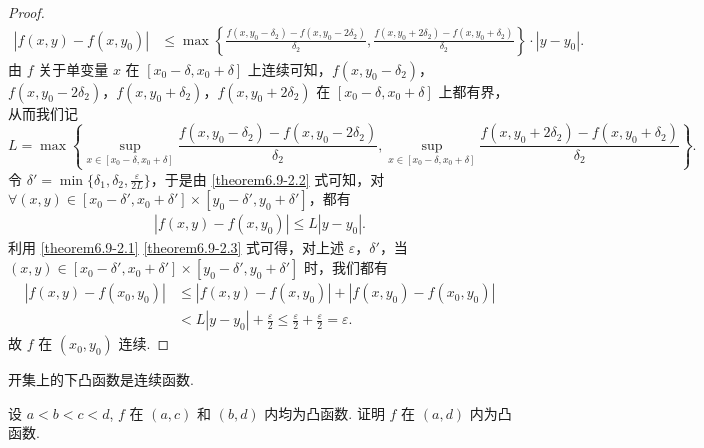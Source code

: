 \documentclass[../../main.tex]{subfiles}%
\begin{document}
\begin{proof}
\begin{align}
|f(x,y) - f(x,y_0)| &\leqslant \max\left\{\frac{f(x,y_0 - \delta_2) - f(x,y_0 - 2\delta_2)}{\delta_2},\frac{f(x,y_0 + 2\delta_2) - f(x,y_0 + \delta_2)}{\delta_2}\right\}\cdot|y - y_0|. \label{theorem6.9-2.2}
\end{align}
由 \(f\) 关于单变量 \(x\) 在 \([x_0 - \delta, x_0 + \delta]\) 上连续可知，\(f(x,y_0 - \delta_2)\)，\(f(x,y_0 - 2\delta_2)\)，\(f(x,y_0 + \delta_2)\)，\(f(x,y_0 + 2\delta_2)\) 在 \([x_0 - \delta, x_0 + \delta]\) 上都有界，从而我们记 \[L = \max\left\{\sup_{x\in [x_0 - \delta, x_0 + \delta]}\frac{f(x,y_0 - \delta_2) - f(x,y_0 - 2\delta_2)}{\delta_2},\sup_{x\in [x_0 - \delta, x_0 + \delta]}\frac{f(x,y_0 + 2\delta_2) - f(x,y_0 + \delta_2)}{\delta_2}\right\}.\]令 \(\delta' = \min\{\delta_1,\delta_2,\frac{\varepsilon}{2L}\}\)，于是由 \eqref{theorem6.9-2.2} 式可知，对 \(\forall (x,y)\in [x_0 - \delta', x_0 + \delta']\times[y_0 - \delta', y_0 + \delta']\)，都有
\begin{align}
|f(x,y) - f(x,y_0)| \leqslant L|y - y_0|. \label{theorem6.9-2.3}
\end{align}
利用 \eqref{theorem6.9-2.1} \eqref{theorem6.9-2.3} 式可得，对上述 \(\varepsilon\)，\(\delta'\)，当 \((x,y)\in [x_0 - \delta', x_0 + \delta']\times[y_0 - \delta', y_0 + \delta']\) 时，我们都有
\begin{align*}
|f(x,y) - f(x_0,y_0)| &\leqslant |f(x,y) - f(x,y_0)|+|f(x,y_0) - f(x_0,y_0)| \\
&< L|y - y_0|+\frac{\varepsilon}{2} 
\leqslant \frac{\varepsilon}{2}+\frac{\varepsilon}{2}=\varepsilon.
\end{align*}
故 \(f\) 在 \((x_0,y_0)\) 连续.
\end{proof}

\begin{corollary}[开集上的下凸函数必连续]\label{corollary:开集上的下凸函数必连续}
开集上的下凸函数是连续函数.
\end{corollary}

\begin{example}
设 $a < b < c < d$, $f$ 在 $(a,c)$ 和 $(b,d)$ 内均为凸函数. 证明 $f$ 在 $(a,d)$ 内为凸函数.
\end{example}
\end{document}
